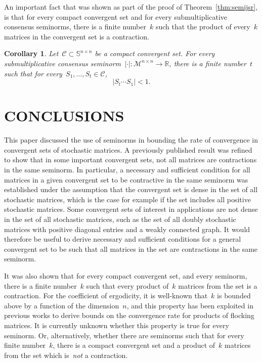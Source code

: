 \documentclass[letterpaper, 10 pt, conference]{ieeeconf}  %
\newtheorem{corollary}{Corollary}
\newcommand{\R}{\mathbb R}
\newcommand{\gensn}[1]{|#1|} %
\newcommand{\eqrowsum}{\mathcal{M}} %
\newcommand{\stoc}{\mathbb{S}} %
\begin{document}
An important fact that was shown as part of the proof of Theorem~\ref{thm:semijsr}, is that for every compact convergent set and for every submultiplicative consensus seminorms, there is a finite number~$k$ such that the product of every~$k$ matrices in the convergent set is a contraction.
\begin{corollary}\label{coro:finite_contract}
    Let~$\mathcal{C} \subset \stoc^{n \times n}$ be a compact convergent set. For every submultiplicative consensus seminorm~$\gensn{\cdot} : \eqrowsum^{n \times n} \to \R$, there is a finite number~$t$ such that for every~$S_1,\dots,S_t \in \mathcal{C}$,
    \begin{equation}
        \gensn{S_t \cdots S_1} < 1.
    \end{equation}
\end{corollary}
\vspace{0.5em}

\section{CONCLUSIONS}

This paper discussed the use of seminorms in bounding the rate of convergence in convergent sets of stochastic matrices. A previously published result was refined to show that in some important convergent sets, not all matrices are contractions in the same seminorm. In particular, a necessary and sufficient condition for all matrices in a given convergent set to be contractive in the same seminorm was established under the assumption that the convergent set is dense in the set of all stochastic matrices, which is the case for example if the set includes all positive stochastic matrices. Some convergent sets of interest in applications are not dense in the set of all stochastic matrices, such as the set of all doubly stochastic matrices with positive diagonal entries and a weakly connected graph. It would therefore be useful to derive necessary and sufficient conditions for a general convergent set to be such that all matrices in the set are contractions in the same seminorm.

It was also shown that for every compact convergent set, and every seminorm, there is a finite number~$k$ such that every product of~$k$ matrices from the set is a contraction. For the coefficient of ergodicity, it is well-known that~$k$ is bounded above by a function of the dimension~$n$, and this property has been exploited in previous works to derive bounds on the convergence rate for products of flocking matrices. It is currently unknown whether this property is true for every seminorm. Or, alternatively, whether there are seminorms such that for every finite number~$k$, there is a compact convergent set and a product of~$k$ matrices from the set which is~\emph{not} a contraction.
\end{document}
